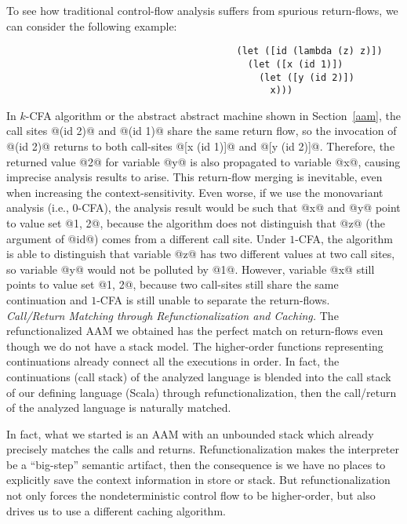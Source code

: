 \documentclass[acmsmall, review]{acmart}\settopmatter{}
\begin{document}
To see how traditional control-flow analysis suffers from spurious return-flows,
we can consider the following example:

\begin{lstlisting}
                                         (let ([id (lambda (z) z)])
                                           (let ([x (id 1)])
                                             (let ([y (id 2)])
                                               x)))
\end{lstlisting}

In $k$-CFA algorithm or the abstract abstract machine shown in Section~\ref{aam},
the call sites @(id 2)@ and @(id 1)@ share the same return flow, so the invocation
of @(id 2)@ returns to both call-sites @[x (id 1)]@ and @[y (id 2)]@.  Therefore,
the returned value @2@ for variable @y@ is also propagated to variable @x@, causing
imprecise analysis results to arise. This return-flow merging is inevitable, even when
increasing the context-sensitivity. Even worse, if we use the monovariant analysis (i.e.,
$0$-CFA), the analysis result would be such that @x@ and @y@ point to value set @{1, 2}@,
because the algorithm does not distinguish that @z@ (the argument of @id@) comes from a
different call site. Under $1$-CFA, the algorithm is able to distinguish that variable
@z@ has two different values at two call sites, so variable @y@ would not be polluted by
@1@. However, variable @x@ still points to value set @{1, 2}@, because two call-sites still
share the same continuation and $1$-CFA is still unable to separate the return-flows. \\

\textit{Call/Return Matching through Refunctionalization and Caching.}
The refunctionalized AAM we obtained has the perfect match on return-flows even though
we do not have a stack model. The higher-order functions representing continuations
already connect all the executions in order. In fact, the continuations (call stack)
of the analyzed language is blended into the call stack of our defining language
(Scala) through refunctionalization, then the call/return of the analyzed language
is naturally matched.

In fact, what we started is an AAM with an unbounded stack which already precisely
matches the calls and returns. Refunctionalization makes the interpreter be a ``big-step''
semantic artifact, then the consequence is we have no places to explicitly save the context
information in store or stack. 
But refunctionalization not only forces the nondeterministic control flow to be higher-order,
but also drives us to use a different caching algorithm.
\end{document}
